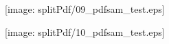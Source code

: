 \documentclass[portrait,a0c,final]{a0poster}
\newenvironment{poster}{
  \begin{center}
  \begin{minipage}[c]{0.98\textwidth}
}{
  \end{minipage} 
  \end{center}
}
\newenvironment{pcolumn}[1]{
  \begin{minipage}{#1\textwidth}
  \begin{center}
}{
  \end{center}
  \end{minipage}
}
\newcommand{\pbox}[4]{
\psshadowbox[#3]{
\begin{minipage}[t][#2][t]{#1}
#4
\end{minipage}
}}
\begin{document}
\begin{poster}
\begin{multicols}{2}
\begin{pcolumn}{0.5}
\texttt{[image: splitPdf/09\_pdfsam\_test.eps]}
\end{pcolumn}
  \begin{pcolumn}{0.5}
 
\texttt{[image: splitPdf/10\_pdfsam\_test.eps]}
\end{pcolumn}
 \end{multicols}

\end{poster}
\end{document}
